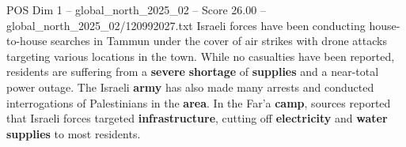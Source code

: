 \begin{textsample}{POS Dim 1 – global\_north\_2025\_02 – Score 26.00 – global\_north\_2025\_02/120992027.txt}
Israeli forces have been conducting house-to-house searches in Tammun under the cover of air strikes with drone attacks targeting various locations in the town.
While no casualties have been reported, residents are suffering from a \textbf{severe} \textbf{shortage} of \textbf{supplies} and a near-total power outage.
The Israeli \textbf{army} has also made many arrests and conducted interrogations of Palestinians in the \textbf{area}.
In the Far'a \textbf{camp}, sources reported that Israeli forces targeted \textbf{infrastructure}, cutting off \textbf{electricity} and \textbf{water} \textbf{supplies} to most residents.

\end{textsample}
